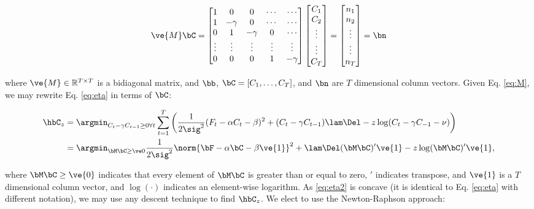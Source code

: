 \begin{align} \label{eq:M}
\ve{M} \bC = %
\begin{bmatrix}
1 & 0  & 0 & \cdots & \cdots \\
1 & -\gamma & 0 & \cdots & \cdots \\
0 & 1 & -\gamma & 0 & \cdots  \\
\vdots & \vdots & \vdots & \vdots & \vdots  \\
0 & 0 & 0 & 1 & -\gamma
\end{bmatrix}
\begin{bmatrix}
C_1 \\ C_2 \\ \vdots \\ \vdots \\ C_T  
\end{bmatrix}
= 
\begin{bmatrix}
n_1 \\ n_2 \\ \vdots \\ \vdots \\ n_T
\end{bmatrix}
= \bn
\end{align}

\noindent where $\ve{M} \in \mathbb{R}^{T \times T}$ is a bidiagonal matrix,  and $\bb$, $\bC=[C_1,\ldots, C_T]$, and $\bn$ are $T$ dimensional column vectors. Given Eq. \eqref{eq:M}, we may rewrite Eq. \eqref{eq:eta} in terms of $\bC$:

\begin{align} 
\hbC_{\zzz} &= \argmin_{C_t - \gamma C_{t-1} \geq 0 \forall t} \sum_{t=1}^{T} \left( \frac{1}{2 \sig^2}(F_t - \alpha C_t - \beta)^2  + (C_t - \gamma C_{t-1}) \lam \Del - \zzz \log(C_t - \gamma C_{-1} -\nu ) \right) \nonumber \\
&= \az  \frac{1}{2 \sig^2} \norm{\bF - \alpha \bC -\beta \ve{1} }^2 + \lam \Del (\bM \bC )' \ve{1}  - \zzz \log(\bM \bC)'\ve{1},  \label{eq:eta2}
\end{align}

\noindent where $\bM \bC \geq \ve{0}$ indicates that every element of $\bM \bC$ is greater than or equal to zero, $'$ indicates transpose, and  $\ve{1}$ is a $T$ dimensional column vector, and $\log(\cdot)$ indicates an element-wise logarithm.  As \eqref{eq:eta2} is concave (it is identical to Eq. \eqref{eq:eta} with different notation), we may use any descent technique to find $\hbC_{\zzz}$.  We elect to use the Newton-Raphson approach: 

